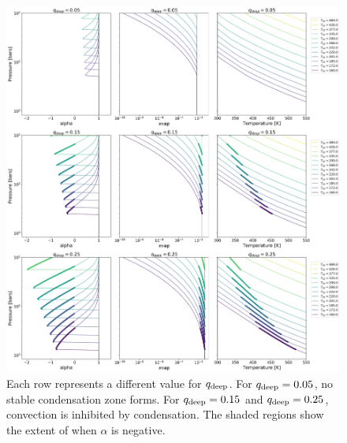 \documentclass[11pt]{ucscthesisbs}
\begin{document}
\begin{figure}[ht!]{}
 \centerline{
  \includegraphics[scale=0.36]{figures/convection_inhibited_2.png}
 }
\caption[Inhibition of convection on Uranus]
{Each row represents a different value for $q_{\rm deep}$. For $q_{\rm deep} = 0.05$, no stable condensation zone forms. For $q_{\rm deep} = 0.15$ and $q_{\rm deep} = 0.25$, convection is inhibited by condensation. The shaded regions show the extent of when $\alpha$ is negative.}
\label{fig:convection_inhibited}
\end{figure}
\end{document}
